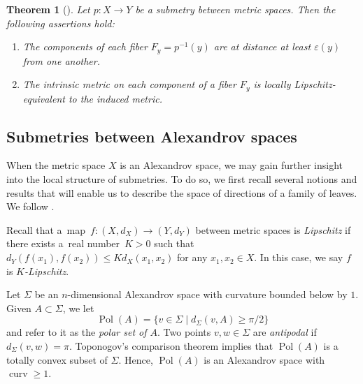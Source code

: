 \documentclass[pdftex]{sigma}
\numberwithin{equation}{section}
\newtheorem{thm}{Theorem}[section]
\theoremstyle{definition}
\DeclareMathOperator{\curv}{curv}
\DeclareMathOperator{\Pol}{Pol}
\begin{document}
\begin{thm}[]
\label{T: Fibers of submetry have the same metric properties as ambient space}
Let $p\colon X\to Y$ be a submetry between metric spaces. Then the following assertions hold:
\begin{enumerate}\itemsep=0pt
	\item[$(1)$] The components of each fiber $F_y = p^{-1}(y)$ are at distance at least $\varepsilon (y)$ from one another.
	\item[$(2)$] The intrinsic metric on each component of a fiber $F_y$ is locally Lipschitz-equivalent to the induced metric.
\end{enumerate}
\end{thm}



\subsection{Submetries between Alexandrov spaces}
\label{SS:submetries.between.alexandrov.spaces}
When the metric space $X$ is an Alexandrov space, we may gain further insight into the local structure of submetries. To do so, we first recall several notions and results that will enable us to describe the space of directions of a family of leaves. We follow \cite{Lytchak}.

Recall that a~map~${f\colon (X,d_X)\to (Y,d_Y)}$ between metric spaces is \emph{Lipschitz} if there exists a~real number~${K>0}$ such that $d_Y(f(x_1),f(x_2))\leq K d_X(x_1,x_2)$ for any $x_1,x_2\in X$. In this case, we say $f$ is \emph{$K$-Lipschitz}.



Let $\Sigma$ be an $n$-dimensional Alexandrov space with curvature bounded below by $1$.
Given $A\subset \Sigma$, we let
\[
\Pol(A) = \{v\in \Sigma \mid d_{\Sigma}(v,A)\geq \pi/2\}
\]
and refer to it as the \emph{polar set of $A$}.
Two points $v,w\in \Sigma$ are \emph{antipodal} if $d_{\Sigma}(v,w) =\pi$. Toponogov's comparison theorem implies that $\Pol(A)$ is a totally convex subset of $\Sigma$. Hence, $\Pol(A)$ is an Alexandrov space with $\curv\geq 1$.
\end{document}
